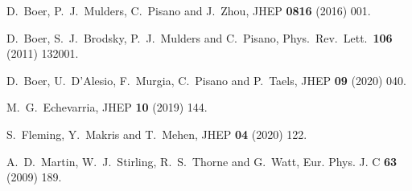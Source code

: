 \documentclass[prd,aps,preprintnumbers,nofootinbib,superscriptaddress]{revtex4}
\begin{document}
\begin{thebibliography}{99}
D.~Boer, P.~J.~Mulders, C.~Pisano and J.~Zhou,
JHEP {\bf0816} (2016) 001. 
  
  D.~Boer, S.~J.~Brodsky, P.~J.~Mulders and C.~Pisano,
  Phys.\ Rev.\ Lett.\  {\bf 106} (2011) 132001.
  
D.~Boer, U.~D'Alesio, F.~Murgia, C.~Pisano and P.~Taels,
JHEP \textbf{09} (2020) 040.

M.~G.~Echevarria,
JHEP \textbf{10} (2019) 144.

S.~Fleming, Y.~Makris and T.~Mehen,
JHEP \textbf{04} (2020) 122.
  
A.~D.~Martin, W.~J.~Stirling, R.~S.~Thorne and G.~Watt,
Eur. Phys. J. C \textbf{63} (2009) 189.
  
\end{thebibliography}
\end{document}

